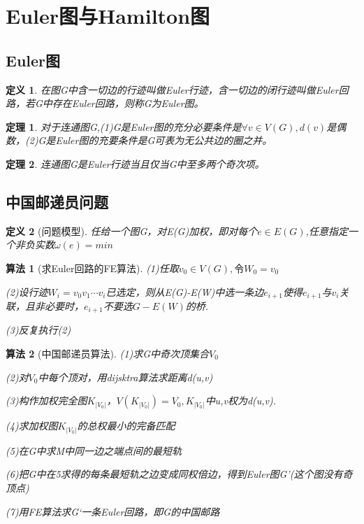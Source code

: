 \documentclass[UTF8]{ctexart}
\newtheorem{dfnt}{定义}
\newtheorem{thr}{定理}
\newtheorem{alg}{算法}
\begin{document}
\section{Euler图与Hamilton图}
\subsection{Euler图}
\begin{dfnt}
在图G中含一切边的行迹叫做Euler行迹，含一切边的闭行迹叫做Euler回路，若G中存在Euler回路，则称G为Euler图。
\end{dfnt}
\begin{thr}
对于连通图G,(1)G是Euler图的充分必要条件是$\forall v\in V(G),d(v)$是偶数，(2)G是Euler图的充要条件是G可表为无公共边的圈之并。
\end{thr}
\begin{thr}
连通图G是Euler行迹当且仅当G中至多两个奇次项。
\end{thr}
\subsection{中国邮递员问题}
\begin{dfnt}[问题模型]
任给一个图G，对E(G)加权，即对每个$e \in E(G)$,任意指定一个非负实数$\omega(e)=min$
\end{dfnt}
\begin{alg}[求Euler回路的FE算法]
\item (1)任取$v_0 \in V(G),令W_0=v_0$
\item (2)设行迹$W_i=v_0v_1\cdots v_i$已选定，则从E(G)-E(W)中选一条边$e_{i+1}$使得$e_{i+1}$与$v_i$关联，且非必要时，$e_{i+1}$不要选$G-E(W)$的桥.
\item (3)反复执行(2)
\end{alg}
\begin{alg}[中国邮递员算法]
\item (1)求G中奇次顶集合$V_0$
\item (2)对$V_0$中每个顶对，用dijsktra算法求距离d(u,v)
\item (3)构作加权完全图$K_{|V_0|}$，$V(K_{|V_0|})=V_0,K_{|V_0|}$中u,v权为d(u,v).
\item (4)求加权图$K_{|V_0|}$的总权最小的完备匹配
\item (5)在G中求M中同一边之端点间的最短轨
\item (6)把G中在5求得的每条最短轨之边变成同权倍边，得到Euler图G'(这个图没有奇顶点)
\item (7)用FE算法求G‘一条Euler回路，即G的中国邮路
\end{alg}
\end{document}
